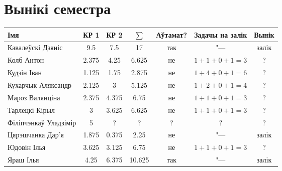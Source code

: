 


    \section{Вынікі семестра}
    \begin{table}[H]
        \begin{minipage}{\textwidth}
            \begin{tabular}{|l|c|c|c|c|c|c|}
                \hline
                Імя                   &    КР 1    &    КР 2   & $\sum$ &  Аўтамат?  &  Задачы на залік  &    Вынік  \\ \hline
                Кавалеўскі Дзяніс     &  9.5    &   7.5   & 17 &  так  & "---  & залік \\ \hline
                Колб Антон            &  2.375    &   4.25   &  6.625 & не & $1+1+0+1=3$ & ? \\ \hline
                Кудзін Іван           &  1.125       &    1.75     &  2.875    &  не & $1+4+0+1=6$ & ? \\ \hline
                Кухарчык Аляксандр    &   2.125      &     3    &   5.125   &   не   & $1+2+0+1=4$ & ? \\ \hline
                Мароз Валянціна       &  2.375    &   4.375   &  6.75 &   не  & $1+1+0+1=3$ & ? \\ \hline
                Тарлецкі Кірыл        &   3      &    3.625     &  6.625    &  не & $1+1+0+1=3$ & ? \\ \hline
                Філіпчэнкаў Уладзімір &  5    &   ?   &  ? &   ?  & ? & ? \\ \hline
                Цярэшчанка Дар'я      & 1.875 &   0.375   &  2.25 &   не  & "--- & залік \\ \hline
                Юдовін Ілья           &  3.625    & 3.125 &  6.75 &   не  & $1+1+0+1=3$ & ? \\ \hline
                Яраш Ілья             &  4.25    &   6.375   &  10.625 & так & "---  & залік \\ \hline
            \end{tabular}
        \end{minipage}
    \end{table}

